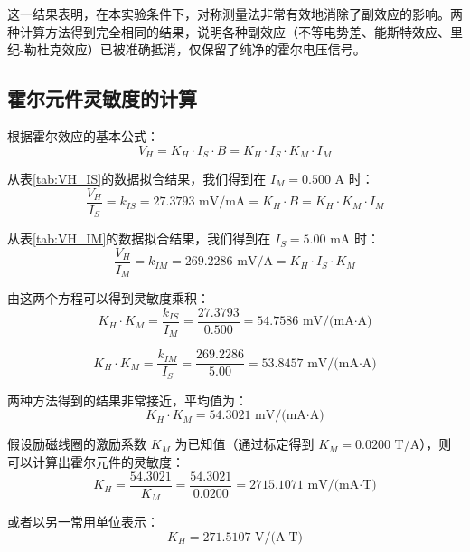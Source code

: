 ﻿\documentclass[12pt,a4paper]{article}
\begin{document}
这一结果表明，在本实验条件下，对称测量法非常有效地消除了副效应的影响。两种计算方法得到完全相同的结果，说明各种副效应（不等电势差、能斯特效应、里纪-勒杜克效应）已被准确抵消，仅保留了纯净的霍尔电压信号。

\subsection{霍尔元件灵敏度的计算}

根据霍尔效应的基本公式：
\begin{equation}
V_H = K_H \cdot I_S \cdot B = K_H \cdot I_S \cdot K_M \cdot I_M
\end{equation}

从表\ref{tab:VH_IS}的数据拟合结果，我们得到在 $I_M = 0.500$ A 时：
\begin{equation}
\frac{V_H}{I_S} = k_{IS} = 27.3793 \text{ mV/mA} = K_H \cdot B = K_H \cdot K_M \cdot I_M
\end{equation}

从表\ref{tab:VH_IM}的数据拟合结果，我们得到在 $I_S = 5.00$ mA 时：
\begin{equation}
\frac{V_H}{I_M} = k_{IM} = 269.2286 \text{ mV/A} = K_H \cdot I_S \cdot K_M
\end{equation}

由这两个方程可以得到灵敏度乘积：
\begin{equation}
K_H \cdot K_M = \frac{k_{IS}}{I_M} = \frac{27.3793}{0.500} = 54.7586 \text{ mV/(mA·A)}
\end{equation}

\begin{equation}
K_H \cdot K_M = \frac{k_{IM}}{I_S} = \frac{269.2286}{5.00} = 53.8457 \text{ mV/(mA·A)}
\end{equation}

两种方法得到的结果非常接近，平均值为：
\begin{equation}
K_H \cdot K_M = 54.3021 \text{ mV/(mA·A)}
\end{equation}

假设励磁线圈的激励系数 $K_M$ 为已知值（通过标定得到 $K_M = 0.0200$ T/A），则可以计算出霍尔元件的灵敏度：
\begin{equation}
K_H = \frac{54.3021}{K_M} = \frac{54.3021}{0.0200} = 2715.1071 \text{ mV/(mA·T)}
\end{equation}

或者以另一常用单位表示：
\begin{equation}
K_H = 271.5107 \text{ V/(A·T)}
\end{equation}
\end{document}
